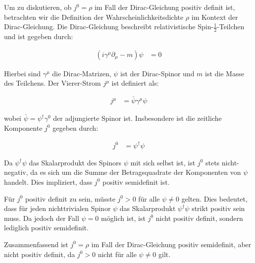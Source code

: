 Um zu diskutieren, ob $j^0 = \rho$ im Fall der Dirac-Gleichung positiv definit ist, betrachten wir die Definition der Wahrscheinlichkeitsdichte $\rho$ im Kontext der Dirac-Gleichung. Die Dirac-Gleichung beschreibt relativistische Spin-$\frac{1}{2}$-Teilchen und ist gegeben durch:

\begin{align*}
(i\gamma^\mu \partial_\mu - m)\psi &= 0
\end{align*}

Hierbei sind $\gamma^\mu$ die Dirac-Matrizen, $\psi$ ist der Dirac-Spinor und $m$ ist die Masse des Teilchens. Der Vierer-Strom $j^\mu$ ist definiert als:

\begin{align*}
j^\mu &= \bar{\psi} \gamma^\mu \psi
\end{align*}

wobei $\bar{\psi} = \psi^\dagger \gamma^0$ der adjungierte Spinor ist. Insbesondere ist die zeitliche Komponente $j^0$ gegeben durch:

\begin{align*}
j^0 &= \psi^\dagger \psi
\end{align*}

Da $\psi^\dagger \psi$ das Skalarprodukt des Spinors $\psi$ mit sich selbst ist, ist $j^0$ stets nicht-negativ, da es sich um die Summe der Betragsquadrate der Komponenten von $\psi$ handelt. Dies impliziert, dass $j^0$ positiv semidefinit ist.

Für $j^0$ positiv definit zu sein, müsste $j^0 > 0$ für alle $\psi \neq 0$ gelten. Dies bedeutet, dass für jeden nichttrivialen Spinor $\psi$ das Skalarprodukt $\psi^\dagger \psi$ strikt positiv sein muss. Da jedoch der Fall $\psi = 0$ möglich ist, ist $j^0$ nicht positiv definit, sondern lediglich positiv semidefinit.

Zusammenfassend ist $j^0 = \rho$ im Fall der Dirac-Gleichung positiv semidefinit, aber nicht positiv definit, da $j^0 > 0$ nicht für alle $\psi \neq 0$ gilt.

